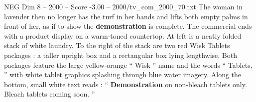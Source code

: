 \begin{textsample}{NEG Dim 8 – 2000 – Score -3.00 – 2000/tv\_com\_2000\_70.txt}
The woman in lavender then no longer has the turf in her hands and lifts both empty palms in front of her, as if to show the \textbf{demonstration} is complete.
The commercial ends with a product display on a warm-toned countertop.
At left is a neatly folded stack of white laundry.
To the right of the stack are two red Wisk Tablets packages : a taller upright box and a rectangular box lying lengthwise.
Both packages feature the large yellow-orange “ Wisk ” name and the words “ Tablets, ” with white tablet graphics splashing through blue water imagery.
Along the bottom, small white text reads : “ \textbf{Demonstration} on non-bleach tablets only.
Bleach tablets coming soon. ”

\end{textsample}
